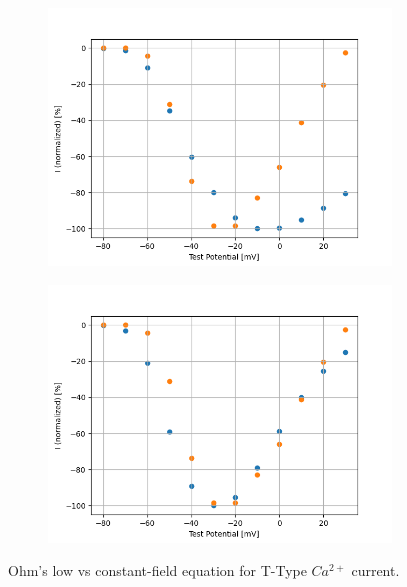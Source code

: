 \documentclass[../main.tex]{subfiles}
\begin{document}
\begin{figure}[!t]
    \begin{subfigure}[t]{0.45\textwidth}
        \centering
        \includegraphics[width=\textwidth]{../../reports/workflow/img/t_type_calcium_channel/simulations/No Scale/Ohm's LawVoltage Step5_IV_Relationship_comparison_Jeong_2015.png}
        \caption{}
        \label{fig_t_type_ohmic_iv_relationship}
    \end{subfigure}
    \hfill
    \begin{subfigure}[t]{0.45\textwidth}
        \centering
        \includegraphics[width=\textwidth]{../../reports/workflow/img/t_type_calcium_channel/simulations/No Scale/Constant Field EquationVoltage Step5_IV_Relationship_comparison_Jeong_2015.png}
        \caption{}
        \label{fig_t_type_constant_field_iv_relationship}
    \end{subfigure}
    
    \caption{Ohm's low vs constant-field equation for T-Type $Ca^{2+}$ current.}
    \label{fig_t_type_voltage_step_ohmic_vs_constant_field}
\end{figure}
\end{document}
